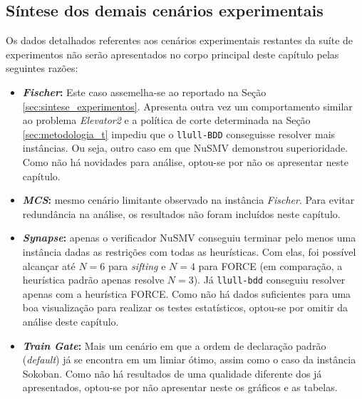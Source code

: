 \documentclass[cic,tc]{infufrgs}
\begin{document}
	\subsection{Síntese dos demais cenários experimentais}
	\label{sec:sintese_experimentos2}
	
	Os dados detalhados referentes aos cenários experimentais restantes da suíte de experimentos não serão apresentados no corpo principal deste capítulo pelas seguintes razões:
	
	\begin{itemize}
		\item \textbf{\textit{Fischer}:} Este caso assemelha-se ao reportado na Seção \ref{sec:sintese_experimentos}. Apresenta outra vez um comportamento similar ao problema \textit{Elevator2} e a política de corte determinada na Seção \ref{sec:metodologia_t} impediu que o \texttt{llull-BDD} conseguisse resolver mais instâncias. Ou seja, outro caso em que NuSMV demonstrou superioridade. Como não há novidades para análise, optou-se por não os apresentar neste capítulo.
		\item \textbf{\textit{MCS}:} mesmo cenário limitante observado na instância \textit{Fischer}. Para evitar redundância na análise, os resultados não foram incluídos neste capítulo.
		\item \textbf{\textit{Synapse}:} apenas o verificador NuSMV conseguiu terminar pelo menos uma instância dadas as restrições com todas as heurísticas. Com elas, foi possível alcançar até $N=6$ para \textit{sifting} e $N=4$ para FORCE (em comparação, a heurística padrão apenas resolve $N=3$). Já \texttt{llull-bdd} conseguiu resolver apenas com a heurística FORCE. Como não há dados suficientes para uma boa visualização para realizar os testes estatísticos, optou-se por omitir da análise deste capítulo.
		\item \textbf{\textit{Train Gate}:} Mais um cenário em que a ordem de declaração padrão (\textit{default}) já se encontra em um limiar ótimo, assim como o caso da instância Sokoban. Como não há resultados de uma qualidade diferente dos já apresentados, optou-se por não apresentar neste os gráficos e as tabelas.
	\end{itemize}
	
\end{document}
